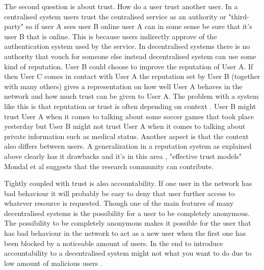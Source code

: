 The second question is about trust.
How do a user trust another user.
In a centralised system users trust the centralised service as an authority or "third-party" so if user A sees user B online user A can in some sense be sure that it's user B that is online.
This is because users indirectly approve of the authentication system used by the service.
In decentralised systems there is no authority that vouch for someone else instead decentralised system can use some kind of reputation.
User B could choose to improve the reputation of User A.
If then User C comes in contact with User A the reputation set by User B (together with many others) gives a representation on how well User A behaves in the network and how much trust can be given to User A.
The problem with a system like this is that reputation or trust is often depending on context \cite{mondal2006}.
User B might trust User A when it comes to talking about some soccer games that took place yesterday but User B might not trust User A when it comes to talking about private information such as medical status.
Another aspect is that the context also differs between users.
A generalization in a reputation system as explained above clearly has it drawbacks and it's in this area , "effective trust models" Mondal et al \cite{mondal2006} suggests that the research community can contribute.

Tightly coupled with trust is also accountability.
If one user in the network has bad behaviour it will probably be easy to deny that user further access to whatever resource is requested.
Though one of the main features of many decentralised systems is the possibility for a user to be completely anonymous.
The possibility to be completely anonymous makes it possible for the user that has bad behaviour in the network to act as a new user when the first one has been blocked by a noticeable amount of users.
In the end to introduce accountability to a decentralised system might not what you want to do due to low amount of malicious users \cite{mondal2006}.


